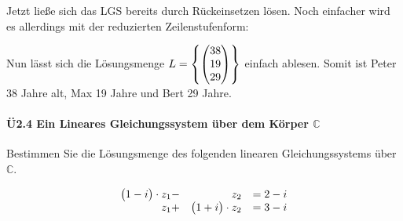 \documentclass{scrreprt}
\begin{document}
Jetzt ließe sich das LGS bereits durch Rückeinsetzen lösen.
Noch einfacher wird es allerdings mit der reduzierten Zeilenstufenform:

Nun lässt sich die Lösungsmenge
$L = \qty{\begin{pmatrix}38 \\ 19 \\ 29\end{pmatrix}}$
einfach ablesen.
Somit ist Peter 38 Jahre alt, Max 19 Jahre und Bert 29 Jahre.

\paragraph{Ü2.4 Ein Lineares Gleichungssystem über dem Körper $\mathbb{C}$}

Bestimmen Sie die Lösungsmenge des folgenden linearen Gleichungssystems über
$\mathbb{C}$.

\[
  \begin{array}{rrl}
    \qty\big(1 - i) \cdot z_1 - &z_2 &= 2 - i  \\
    z_1 +& \qty\big(1 + i) \cdot z_2 &= 3 - i
  \end{array}
\]
\end{document}
